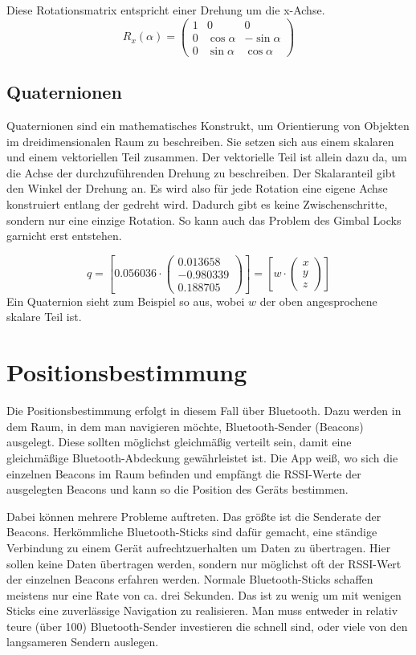 Diese Rotationsmatrix entspricht einer Drehung um die x-Achse.
$$
R_x(\alpha) = \begin{pmatrix} 
1 &   0         & 0           \\
0 & \cos \alpha & -\sin \alpha \\
0 & \sin \alpha &  \cos \alpha
\end{pmatrix} 
$$

\subsection{Quaternionen}
Quaternionen sind ein mathematisches Konstrukt, um Orientierung von Objekten im dreidimensionalen Raum zu beschreiben. Sie setzen sich aus einem skalaren und einem vektoriellen Teil zusammen. Der vektorielle Teil ist allein dazu da, um die Achse der durchzuführenden Drehung zu beschreiben. Der Skalaranteil gibt den Winkel der Drehung an. Es wird also für jede Rotation eine eigene Achse konstruiert entlang der gedreht wird. Dadurch gibt es keine Zwischenschritte, sondern nur eine einzige Rotation. So kann auch das Problem des Gimbal Locks garnicht erst entstehen.

$$
q=\left\lbrack
0.056036\cdot \begin{pmatrix}
0.013658\\
-0.980339\\
0.188705
\end{pmatrix}\right\rbrack
= \left\lbrack w\cdot\begin{pmatrix}
x\\
y\\
z
\end{pmatrix} \right\rbrack
$$
Ein Quaternion sieht zum Beispiel so aus, wobei $w$ der oben angesprochene skalare Teil ist. \cite{paper:001}


\section{Positionsbestimmung}
Die Positionsbestimmung erfolgt in diesem Fall über Bluetooth. Dazu werden in dem Raum, in dem man navigieren möchte, Bluetooth-Sender (Beacons) ausgelegt. Diese sollten möglichst gleichmäßig verteilt sein, damit eine gleichmäßige Bluetooth-Abdeckung gewährleistet ist. Die App weiß, wo sich die einzelnen Beacons im Raum befinden und empfängt die RSSI-Werte der ausgelegten Beacons und kann so die Position des Geräts bestimmen. 

Dabei können mehrere Probleme auftreten. Das größte ist die Senderate der Beacons. Herkömmliche Bluetooth-Sticks sind dafür gemacht, eine ständige Verbindung zu einem Gerät aufrechtzuerhalten um Daten zu übertragen. Hier sollen keine Daten übertragen werden, sondern nur möglichst oft der RSSI-Wert der einzelnen Beacons erfahren werden. Normale Bluetooth-Sticks schaffen meistens nur eine Rate von ca. drei Sekunden. Das ist zu wenig um mit wenigen Sticks eine zuverlässige Navigation zu realisieren. Man muss entweder in relativ teure (über 100\texteuro) Bluetooth-Sender investieren die schnell sind, oder viele von den langsameren Sendern auslegen.

